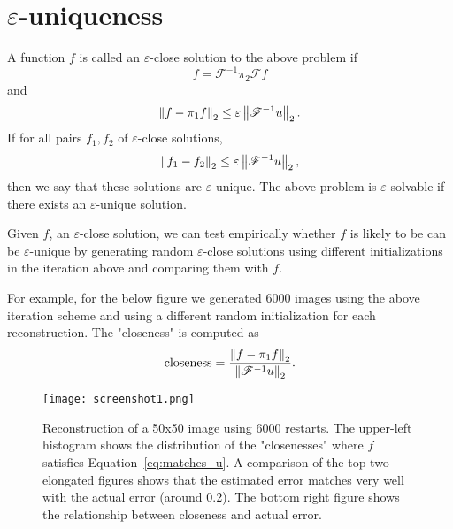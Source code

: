 \documentclass[10pt]{article}
\begin{document}
\section {$\varepsilon$-uniqueness}

A function $f$ is called an $\varepsilon$-close solution to the above problem if 
\begin{equation}
f=\mathscr{F}^{-1}\pi_2\mathscr{F} f
\label{eq:matches_u}
\end{equation}
and 
$$
\left\lVert f-\pi_1 f\right\rVert_2\leq \varepsilon \left\lVert\mathscr{F}^{-1}u\right\rVert_2.
$$
If for all pairs $f_1,f_2$ of $\varepsilon$-close solutions, 
$$\left\lVert f_1 - f_2\right\rVert_2\leq \varepsilon\left\lVert\mathscr{F}^{-1}u\right\rVert_2,$$ then we say that these solutions are $\varepsilon$-unique. The above problem is $\varepsilon$-solvable if there exists an $\varepsilon$-unique solution.

Given $f$, an $\varepsilon$-close solution, we can test empirically whether $f$ is likely to be can be $\varepsilon$-unique by generating random $\varepsilon$-close solutions using different initializations in the iteration above and comparing them with $f$.

For example, for the below figure we generated 6000 images using the above iteration scheme and using a different random initialization for each reconstruction. The "closeness" is computed as
$$\text{closeness}=\frac{\left\lVert f-\pi_1 f\right\rVert_2}{\left\lVert\mathscr{F}^{-1}u\right\rVert_2}.$$

\begin{figure}
\begin{center}
\texttt{[image: screenshot1.png]}
\end{center}
\caption{Reconstruction of a 50x50 image using 6000 restarts. The upper-left histogram shows the distribution of the "closenesses"
where $f$ satisfies Equation~\eqref{eq:matches_u}. 
A comparison of the top two elongated figures shows that the estimated error matches very well with the actual error (around 0.2).
The bottom right figure shows the relationship between closeness and actual error.
}
\end{figure}
\end{document}
